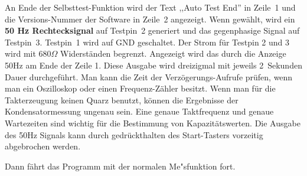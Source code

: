 An Ende der Selbsttest-Funktion wird der Text ,,Auto Test End'' in Zeile~1 und die Versions-Nummer der Software in Zeile~2 angezeigt.
Wenn gew\"ahlt, wird ein {\bf 50 Hz Rechtecksignal} auf Testpin~2 generiert und das gegenphasige Signal auf Testpin~3.
Testpin~1 wird auf GND geschaltet. Der Strom f\"ur Testpin 2 und 3 wird mit \(680\Omega\) Widerst\"anden begrenzt.
Angezeigt wird das durch die Anzeige 50Hz am Ende der Zeile 1.
Diese Ausgabe wird dreizigmal mit jeweils 2~Sekunden Dauer durchgef\"uhrt.
Man kann die Zeit der Verz\"ogerungs-Aufrufe pr\"ufen, wenn man ein Oszilloskop oder einen
Frequenz-Z\"ahler besitzt.
Wenn man f\"ur die Takterzeugung keinen Quarz benutzt, k\"onnen die
Ergebnisse der Kondensatormessung ungenau sein.
Eine genaue Taktfrequenz und genaue Wartezeiten sind wichtig f\"ur die Bestimmung von Kapazit\"atswerten.
Die Ausgabe des 50Hz Signals kann durch gedr\"uckthalten des Start-Tasters vorzeitig abgebrochen werden.

Dann f\"ahrt das Programm mit der normalen Me"sfunktion fort.

